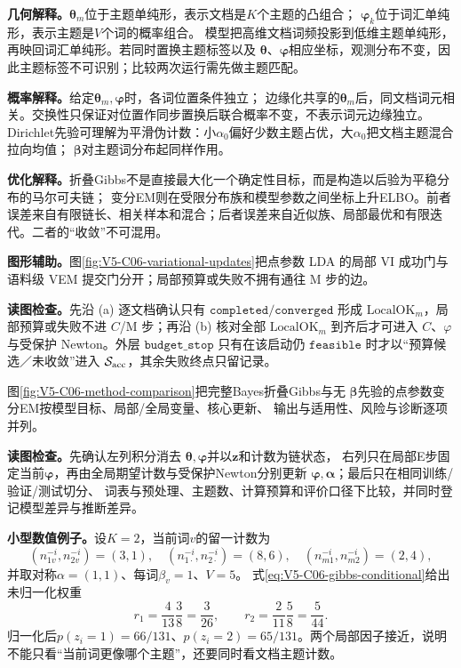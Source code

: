 \label{struct:V5-C06-CH14}
\textbf{几何解释。}$\boldsymbol\theta_m$位于主题单纯形，表示文档是$K$个主题的凸组合；
$\boldsymbol\varphi_k$位于词汇单纯形，表示主题是$V$个词的概率组合。
模型把高维文档词频投影到低维主题单纯形，再映回词汇单纯形。若同时置换主题标签以及
$\boldsymbol\theta$、$\boldsymbol\varphi$相应坐标，观测分布不变，因此主题标签不可识别；比较两次运行需先做主题匹配。

\label{struct:V5-C06-CH15}
\textbf{概率解释。}给定$\boldsymbol\theta_m,\boldsymbol\varphi$时，各词位置条件独立；
边缘化共享的$\boldsymbol\theta_m$后，同文档词元相关。交换性只保证对位置作同步置换后联合概率不变，不表示词元边缘独立。
Dirichlet先验可理解为平滑伪计数：小$\alpha_0$偏好少数主题占优，大$\alpha_0$把文档主题混合拉向均值；
$\boldsymbol\beta$对主题词分布起同样作用。

\label{struct:V5-C06-CH16}
\textbf{优化解释。}折叠Gibbs不是直接最大化一个确定性目标，而是构造以后验为平稳分布的马尔可夫链；
变分EM则在受限分布族和模型参数之间坐标上升ELBO。前者误差来自有限链长、相关样本和混合；后者误差来自近似族、局部最优和有限迭代。二者的“收敛”不可混用。

\label{struct:V5-C06-CH17}
\textbf{图形辅助。}图\ref{fig:V5-C06-variational-updates}把点参数 LDA 的局部 VI 成功门与语料级 VEM 提交门分开；局部预算或失败不拥有通往 M 步的边。

\FloatBarrier
\textbf{读图检查。}先沿 (a) 逐文档确认只有 $\mathtt{completed}/\mathtt{converged}$ 形成 $\mathrm{LocalOK}_m$，局部预算或失败不进 $C$/M 步；再沿 (b) 核对全部 $\mathrm{LocalOK}_m$ 到齐后才可进入 $C$、$\varphi$ 与受保护 Newton。外层 $\mathtt{budget\_stop}$ 只有在该启动仍 $\mathtt{feasible}$ 时才以“预算候选／未收敛”进入 $\mathcal S_{\rm acc}$，其余失败终点只留记录。

图\ref{fig:V5-C06-method-comparison}把完整Bayes折叠Gibbs与无
$\boldsymbol\beta$先验的点参数变分EM按模型目标、局部/全局变量、核心更新、
输出与适用性、风险与诊断逐项并列。

\FloatBarrier
\noindent\textbf{读图检查。}先确认左列积分消去
$\boldsymbol\theta,\boldsymbol\varphi$并以$\boldsymbol z$和计数为链状态，
右列只在局部E步固定当前$\boldsymbol\varphi$，再由全局期望计数与受保护Newton分别更新
$\boldsymbol\varphi,\boldsymbol\alpha$；最后只在相同训练/验证/测试切分、
词表与预处理、主题数、计算预算和评价口径下比较，并同时登记模型差异与推断差异。

\label{struct:V5-C06-CH18}
\textbf{小型数值例子。}设$K=2$，当前词$v$的留一计数为
\[
(n_{1v}^{-i},n_{2v}^{-i})=(3,1),\quad
(n_{1\cdot}^{-i},n_{2\cdot}^{-i})=(8,6),\quad
(n_{m1}^{-i},n_{m2}^{-i})=(2,4),
\]
并取对称$\alpha=(1,1)$、每词$\beta_v=1$、$V=5$。
式\eqref{eq:V5-C06-gibbs-conditional}给出未归一化权重
\[
r_1=\frac4{13}\frac3{8}=\frac3{26},\qquad
r_2=\frac2{11}\frac5{8}=\frac5{44}.
\]
归一化后$p(z_i=1)=66/131$、$p(z_i=2)=65/131$。两个局部因子接近，说明不能只看“当前词更像哪个主题”，还要同时看文档主题计数。

